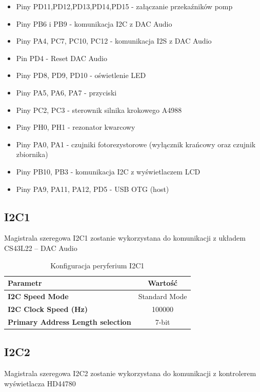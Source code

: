 \documentclass[10pt, a4paper]{article}
\begin{document}
\begin{itemize}
\item Piny PD11,PD12,PD13,PD14,PD15 - załączanie przekaźników pomp
\item Piny PB6 i PB9 - komunikacja I2C z DAC Audio
\item Piny PA4, PC7, PC10, PC12 - komunikacja I2S z DAC Audio
\item Pin PD4 - Reset DAC Audio
\item Piny PD8, PD9, PD10 - oświetlenie LED
\item Piny PA5, PA6, PA7 - przyciski
\item Piny PC2, PC3 - sterownik silnika krokowego A4988
\item Piny PH0, PH1 - rezonator kwarcowy
\item Piny PA0, PA1 - czujniki fotorezystorowe (wyłącznik krańcowy oraz czujnik zbiornika)
\item Piny PB10, PB3 - komunikacja I2C z wyświetlaczem LCD
\item Piny PA9, PA11, PA12, PD5 - USB OTG (host)
\end{itemize}



\subsection{I2C1}

Magistrala szeregowa I2C1 zostanie wykorzystana do komunikacji z układem CS43L22 -- DAC Audio

\begin{table}[H]
	\centering
	\begin{tabular}{|l|c|} \hline
		\textbf{Parametr} & Wartość \\
		\hline
		\hline  \textbf{I2C Speed Mode}& Standard Mode \\  \hline
		\textbf{I2C Clock Speed (Hz) } & 100000 \\
		
		\hline  \textbf{Primary Address Length selection}& 7-bit  \\\hline

	\end{tabular}
	\caption{Konfiguracja peryferium I2C1}
	\label{tab:USART}
\end{table}
\subsection{I2C2}

Magistrala szeregowa I2C2 zostanie wykorzystana do komunikacji z kontrolerem wyświetlacza HD44780 
\end{document}
